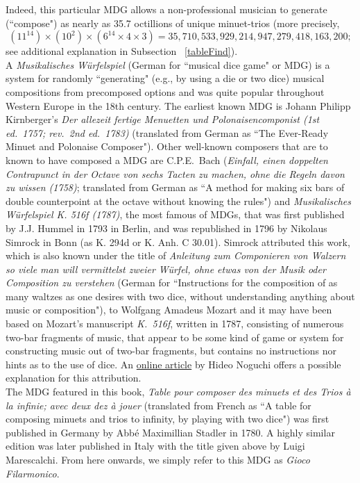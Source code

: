 \documentclass[a4paper,x11names,svgnames,10pt]{article}
\begin{document}
{Indeed, this particular MDG allows a non-professional musician to generate (``compose") as nearly as 35.7 octillions of unique minuet-trios (more precisely, $$(11^{14})\times(10^2)\times(6^{14}\times 4\times 3) = 35,710,533,929,214,947,279,418,163,200;$$ see additional explanation in Subsection ~\ref{tableFind}).\\  

A {\it Musikalisches W\"{u}rfelspiel} (German for ``musical dice game" or MDG) is a system for randomly ``generating" (e.g., by using a die or two dice) musical compositions from precomposed options and was quite popular throughout Western Europe in the 18th century.  The earliest known MDG is Johann Philipp Kirnberger's {\em Der allezeit fertige Menuetten und Polonaisencomponist (1st ed.\ 1757; rev.\ 2nd ed.\ 1783)} (translated from German as ``The Ever-Ready Minuet and Polonaise Composer").  Other well-known composers that are to known to have composed a MDG are C.P.E.\ Bach ({\em Einfall, einen doppelten Contrapunct in der Octave von sechs Tacten zu machen, ohne die Regeln davon zu wissen (1758)}; translated from German as ``A method for making six bars of double counterpoint at the octave without knowing the rules") and {\it Musikalisches W\"{u}rfelspiel K. 516f (1787)}, the most famous of MDGs, that was first published by J.J. Hummel in 1793 in Berlin, and was republished in 1796 by Nikolaus Simrock in Bonn (as K. 294d or K. Anh. C 30.01). Simrock attributed this work, which is also known under the title of {\em Anleitung zum Componieren von Walzern so viele man will vermittelst zweier Würfel, ohne etwas von der Musik oder Composition zu verstehen} (German for ``Instructions for the composition of as many waltzes as one desires with two dice, without understanding anything about music or composition"), to Wolfgang Amadeus Mozart and it may have been based on Mozart's manuscript {\em K.\ 516f}, written in 1787, consisting of numerous two-bar fragments of music, that appear to be some kind of game or system for constructing music out of two-bar fragments, but contains no instructions nor hints as to the use of dice.  An \href{(http://www.asahi-net.or.jp/\~rb5h-ngc/e/k516f.htm}{online article} by Hideo Noguchi offers a possible explanation for this attribution. \\

The MDG featured in this book, {\em Table pour composer des minuets et des Trios \`{a} la infinie; avec deux dez \`{a} jouer} (translated from French as  ``A table for composing minuets and trios to infinity, by playing with two dice") was first published in Germany by Abb\'{e} Maximillian Stadler in 1780. A highly similar edition was later published in Italy with the title given above by Luigi Marescalchi.  From here onwards, we simply refer to this MDG as {\em Gioco Filarmonico}.  \\

}
\end{document}
